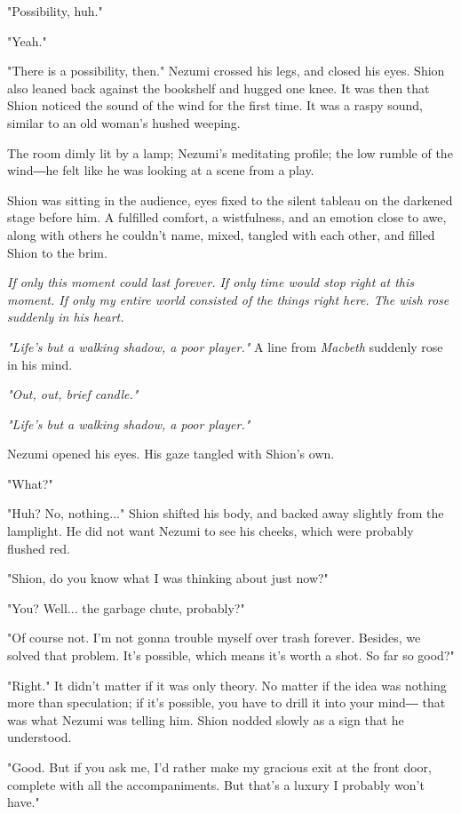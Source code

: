 "Possibility, huh."

"Yeah."

"There is a possibility, then." Nezumi crossed his legs, and closed his
eyes. Shion also leaned back against the bookshelf and hugged one knee.
It was then that Shion noticed the sound of the wind for the first time.
It was a raspy sound, similar to an old woman's hushed weeping.

The room dimly lit by a lamp; Nezumi's meditating profile; the low
rumble of the wind―he felt like he was looking at a scene from a play.

Shion was sitting in the audience, eyes fixed to the silent tableau on
the darkened stage before him. A fulfilled comfort, a wistfulness, and
an emotion close to awe, along with others he couldn't name, mixed,
tangled with each other, and filled Shion to the brim.

\emph{If only this moment could last forever. If only time would stop right at
this moment. If only my entire world consisted of the things right here.
The wish rose suddenly in his heart.}

\emph{"Life's but a walking shadow, a poor player."} A line from \emph{Macbeth}
suddenly rose in his mind.

\emph{"Out, out, brief candle."}

\emph{"Life's but a walking shadow, a poor player."}

Nezumi opened his eyes. His gaze tangled with Shion's own.

"What?"

"Huh? No, nothing..." Shion shifted his body, and backed away slightly
from the lamplight. He did not want Nezumi to see his cheeks, which were
probably flushed red.

"Shion, do you know what I was thinking about just now?"

"You? Well... the garbage chute, probably?"

"Of course not. I'm not gonna trouble myself over trash forever.
Besides, we solved that problem. It's possible, which means it's worth a
shot. So far so good?"

"Right." It didn't matter if it was only theory. No matter if the idea
was nothing more than speculation; if it's possible, you have to drill
it into your mind― that was what Nezumi was telling him. Shion nodded
slowly as a sign that he understood.

"Good. But if you ask me, I'd rather make my gracious exit at the front
door, complete with all the accompaniments. But that's a luxury I
probably won't have."

